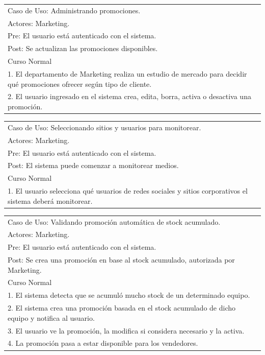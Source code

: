 \vspace{1cm}

\begin{tabular}{ | p{14cm} | }
  \hline
  Caso de Uso: Administrando promociones. \\
  Actores: Marketing. \\
  Pre: El usuario está autenticado con el sistema. \\
  Post: Se actualizan las promociones disponibles. \\
  \hline
  Curso Normal\\
  \hline
  1. El departamento de Marketing realiza un estudio de mercado para decidir qué promociones ofrecer según tipo de cliente. \\
  2. El usuario ingresado en el sistema crea, edita, borra, activa o desactiva una promoción. \\
  \hline
\end{tabular}

\vspace{1cm}

\begin{tabular}{ | p{14cm} | }
  \hline
  Caso de Uso: Seleccionando sitios y usuarios para monitorear. \\
  Actores: Marketing. \\
  Pre: El usuario está autenticado con el sistema. \\
  Post: El sistema puede comenzar a monitorear medios. \\
  \hline
  Curso Normal\\
  \hline
  1. El usuario selecciona qué usuarios de redes sociales y sitios corporativos el sistema deberá monitorear. \\
  \hline
\end{tabular}

\vspace{1cm}

\begin{tabular}{ | p{14cm} | }
  \hline
  Caso de Uso: Validando promoción automática de stock acumulado. \\
  Actores: Marketing. \\
  Pre: El usuario está autenticado con el sistema. \\
  Post: Se crea una promoción en base al stock acumulado, autorizada por Marketing. \\
  \hline
  Curso Normal\\
  \hline
  1. El sistema detecta que se acumuló mucho stock de un determinado equipo. \\
  2. El sistema crea una promoción basada en el stock acumulado de dicho equipo y notifica al usuario. \\
  3. El usuario ve la promoción, la modifica si considera necesario y la activa. \\
  4. La promoción pasa a estar disponible para los vendedores. \\
  \hline
\end{tabular}

